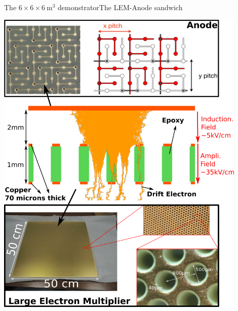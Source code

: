 \documentclass[10pt]{beamer}
\begin{document}
\begin{frame}{The \texorpdfstring{$6 \times 6 \times \SI{6}{\meter\cubed}$}{666}
    		demonstrator}{The LEM-Anode sandwich}
\begin{minipage}{0.48\textwidth}
   			\includegraphics[width=0.9\textwidth]{figures/666/lem_anode.png}
   		\end{minipage}
    \end{frame}
    
\end{document}
